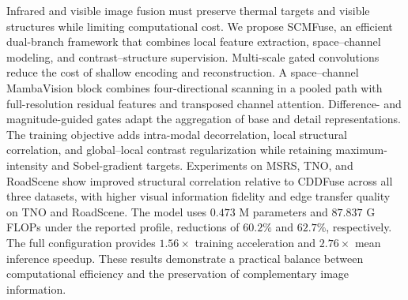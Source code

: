 Infrared and visible image fusion must preserve thermal targets and visible structures while limiting computational cost. We propose SCMFuse, an efficient dual-branch framework that combines local feature extraction, space--channel modeling, and contrast--structure supervision. Multi-scale gated convolutions reduce the cost of shallow encoding and reconstruction. A space--channel MambaVision block combines four-directional scanning in a pooled path with full-resolution residual features and transposed channel attention. Difference- and magnitude-guided gates adapt the aggregation of base and detail representations. The training objective adds intra-modal decorrelation, local structural correlation, and global--local contrast regularization while retaining maximum-intensity and Sobel-gradient targets. Experiments on MSRS, TNO, and RoadScene show improved structural correlation relative to CDDFuse across all three datasets, with higher visual information fidelity and edge transfer quality on TNO and RoadScene. The model uses $0.473$ M parameters and $87.837$ G FLOPs under the reported profile, reductions of $60.2\%$ and $62.7\%$, respectively. The full configuration provides $1.56\times$ training acceleration and $2.76\times$ mean inference speedup. These results demonstrate a practical balance between computational efficiency and the preservation of complementary image information.
